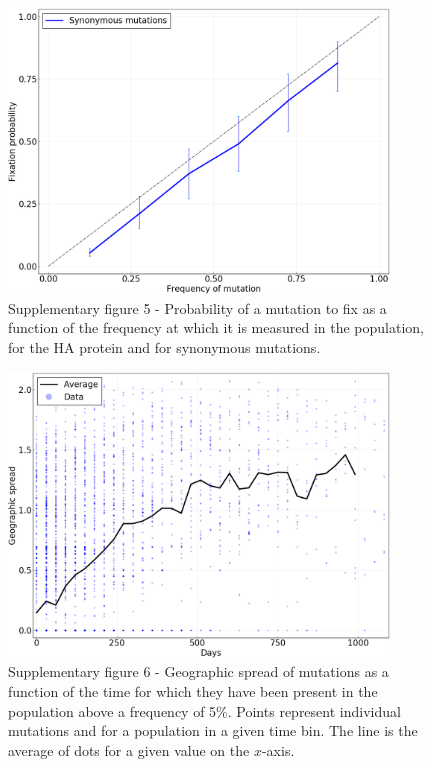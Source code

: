 \documentclass{article}
\begin{document}
	\begin{figure}
		\centering
		\includegraphics[width=0.9\textwidth]{SM_figures/Pfix_v_freq_syn.png}
		\caption{Supplementary figure 5 - Probability of a mutation to fix as a function of the frequency at which it is measured in the population, for the HA protein and for synonymous mutations.}
		\label{fig:pfix_v_freq_syn}
	\end{figure}

	\begin{figure}
		\centering
		\includegraphics[width=0.9\textwidth]{SM_figures/GeoSpread_v_time_ha.png}
		\caption{Supplementary figure 6 - Geographic spread of mutations as a function of the time for which they have been present in the population above a frequency of 5\%. Points represent individual mutations and for a population in a given time bin. The line is the average of dots for a given value on the $x$-axis.}
		\label{fig:geospread_v_time}
	\end{figure}
\end{document}
